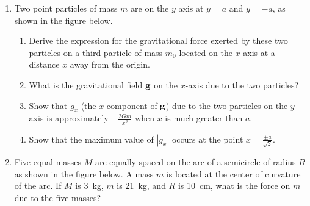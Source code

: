 \documentclass{../../../oss-apphys}
\begin{document}
\begin{enumerate}[leftmargin=15pt]
\item Two point particles of mass $m$ are on the $y$ axis at $y=a$ and $y=-a$,
  as shown in the figure below.
  \begin{center}
  \end{center}
  \begin{enumerate}[nosep]
  \item Derive the expression for the gravitational force exerted by these two
    particles on a third particle of mass $m_0$ located on the $x$ axis at a
    distance $x$ away from the origin.
  \item What is the gravitational field $\mathbf{g}$ on the $x$-axis due to the
    two particles?
  \item Show that $g_x$ (the $x$ component of $\mathbf{g}$) due to the two
    particles on the $y$ axis is approximately $\displaystyle-\frac{2Gm}{x^2}$
    when $x$ is much greater than $a$.
  \item Show that the maximum value of $|g_x|$ occurs at the point
    $\displaystyle x=\frac{\pm a}{\sqrt{2}}$.
  \end{enumerate}
  \newpage

\item Five equal masses $M$ are equally spaced on the arc of a semicircle of
  radius $R$ as shown in the figure below. A mass $m$ is located at the center
  of curvature of the arc. If $M$ is \SI{3}{\kilo\gram}, $m$ is
  \SI{21}{\kilo\gram}, and $R$ is \SI{10}{\centi\metre}, what is the force on
  $m$ due to the five masses?
  \begin{center}
  \end{center}
\end{enumerate}
\end{document}

